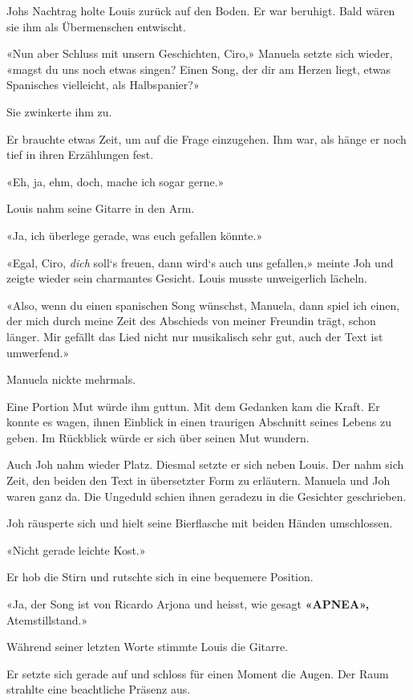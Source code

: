 Johs Nachtrag holte Louis zurück auf den Boden. Er war beruhigt. Bald
wären sie ihm als Übermenschen entwischt.

«Nun aber Schluss mit unsern Geschichten, Ciro,» Manuela setzte sich
wieder, «magst du uns noch etwas singen? Einen Song, der dir am Herzen
liegt, etwas Spanisches vielleicht, als Halbspanier?»

Sie zwinkerte ihm zu.

Er brauchte etwas Zeit, um auf die Frage einzugehen. Ihm war, als hänge
er noch tief in ihren Erzählungen fest.

«Eh, ja, ehm, doch, mache ich sogar gerne.»

Louis nahm seine Gitarre in den Arm.

«Ja, ich überlege gerade, was euch gefallen könnte.»

«Egal, Ciro, \emph{dich} soll`s freuen, dann wird`s auch uns gefallen,»
meinte Joh und zeigte wieder sein charmantes Gesicht. Louis musste
unweigerlich lächeln.

«Also, wenn du einen spanischen Song wünschst, Manuela, dann spiel ich
einen, der mich durch meine Zeit des Abschieds von meiner Freundin
trägt, schon länger. Mir gefällt das Lied nicht nur musikalisch sehr
gut, auch der Text ist umwerfend.»

Manuela nickte mehrmals.

Eine Portion Mut würde ihm guttun. Mit dem Gedanken kam die Kraft. Er
konnte es wagen, ihnen Einblick in einen traurigen Abschnitt seines
Lebens zu geben. Im Rückblick würde er sich über seinen Mut wundern.

Auch Joh nahm wieder Platz. Diesmal setzte er sich neben Louis. Der nahm
sich Zeit, den beiden den Text in übersetzter Form zu erläutern. Manuela
und Joh waren ganz da. Die Ungeduld schien ihnen geradezu in die
Gesichter geschrieben.

Joh räusperte sich und hielt seine Bierflasche mit beiden Händen
umschlossen.

«Nicht gerade leichte Kost.»

Er hob die Stirn und rutschte sich in eine bequemere Position.

«Ja, der Song ist von Ricardo Arjona und heisst, wie gesagt
\textbf{«APNEA»,} Atemstillstand.»

Während seiner letzten Worte stimmte Louis die Gitarre.

Er setzte sich gerade auf und schloss für einen Moment die Augen. Der
Raum strahlte eine beachtliche Präsenz aus.

